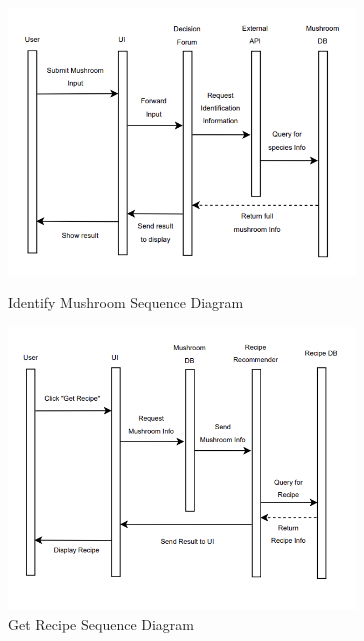 \documentclass[]{article}
\begin{document}
\vspace{1.5cm}

\begin{figure}[h]
    \centering

    \begin{minipage}[b]{\textwidth}
        \centering
        \includegraphics[width=0.82\textwidth]{IdentifyMushroomSequenceDiagram.png}
        \caption{Identify Mushroom Sequence Diagram}
        \label{fig:identify}
    \end{minipage}

    \vspace{0.4cm}

    \begin{minipage}[b]{\textwidth}
        \centering
        \includegraphics[width=0.82\textwidth]{GetRecipeSequenceDiagram.png}
        \caption{Get Recipe Sequence Diagram}
        \label{fig:recipe}
    \end{minipage}
\end{figure}
\end{document}
